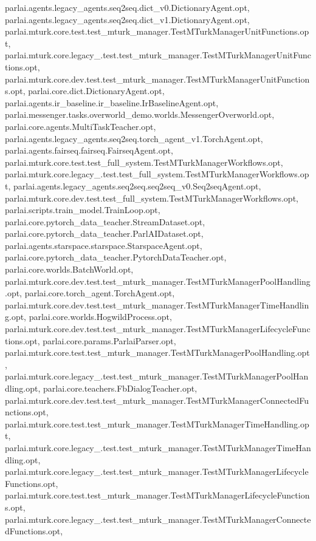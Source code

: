 parlai.\+agents.\+legacy\+\_\+agents.\+seq2seq.\+dict\+\_\+v0.\+Dictionary\+Agent.\+opt, parlai.\+agents.\+legacy\+\_\+agents.\+seq2seq.\+dict\+\_\+v1.\+Dictionary\+Agent.\+opt, parlai.\+mturk.\+core.\+test.\+test\+\_\+mturk\+\_\+manager.\+Test\+M\+Turk\+Manager\+Unit\+Functions.\+opt, parlai.\+mturk.\+core.\+legacy\+\_.\+test.\+test\+\_\+mturk\+\_\+manager.\+Test\+M\+Turk\+Manager\+Unit\+Functions.\+opt, parlai.\+mturk.\+core.\+dev.\+test.\+test\+\_\+mturk\+\_\+manager.\+Test\+M\+Turk\+Manager\+Unit\+Functions.\+opt, parlai.\+core.\+dict.\+Dictionary\+Agent.\+opt, parlai.\+agents.\+ir\+\_\+baseline.\+ir\+\_\+baseline.\+Ir\+Baseline\+Agent.\+opt, parlai.\+messenger.\+tasks.\+overworld\+\_\+demo.\+worlds.\+Messenger\+Overworld.\+opt, parlai.\+core.\+agents.\+Multi\+Task\+Teacher.\+opt, parlai.\+agents.\+legacy\+\_\+agents.\+seq2seq.\+torch\+\_\+agent\+\_\+v1.\+Torch\+Agent.\+opt, parlai.\+agents.\+fairseq.\+fairseq.\+Fairseq\+Agent.\+opt, parlai.\+mturk.\+core.\+test.\+test\+\_\+full\+\_\+system.\+Test\+M\+Turk\+Manager\+Workflows.\+opt, parlai.\+mturk.\+core.\+legacy\+\_.\+test.\+test\+\_\+full\+\_\+system.\+Test\+M\+Turk\+Manager\+Workflows.\+opt, parlai.\+agents.\+legacy\+\_\+agents.\+seq2seq.\+seq2seq\+\_\+v0.\+Seq2seq\+Agent.\+opt, parlai.\+mturk.\+core.\+dev.\+test.\+test\+\_\+full\+\_\+system.\+Test\+M\+Turk\+Manager\+Workflows.\+opt, parlai.\+scripts.\+train\+\_\+model.\+Train\+Loop.\+opt, parlai.\+core.\+pytorch\+\_\+data\+\_\+teacher.\+Stream\+Dataset.\+opt, parlai.\+core.\+pytorch\+\_\+data\+\_\+teacher.\+Parl\+A\+I\+Dataset.\+opt, parlai.\+agents.\+starspace.\+starspace.\+Starspace\+Agent.\+opt, parlai.\+core.\+pytorch\+\_\+data\+\_\+teacher.\+Pytorch\+Data\+Teacher.\+opt, parlai.\+core.\+worlds.\+Batch\+World.\+opt, parlai.\+mturk.\+core.\+dev.\+test.\+test\+\_\+mturk\+\_\+manager.\+Test\+M\+Turk\+Manager\+Pool\+Handling.\+opt, parlai.\+core.\+torch\+\_\+agent.\+Torch\+Agent.\+opt, parlai.\+mturk.\+core.\+dev.\+test.\+test\+\_\+mturk\+\_\+manager.\+Test\+M\+Turk\+Manager\+Time\+Handling.\+opt, parlai.\+core.\+worlds.\+Hogwild\+Process.\+opt, parlai.\+mturk.\+core.\+dev.\+test.\+test\+\_\+mturk\+\_\+manager.\+Test\+M\+Turk\+Manager\+Lifecycle\+Functions.\+opt, parlai.\+core.\+params.\+Parlai\+Parser.\+opt, parlai.\+mturk.\+core.\+test.\+test\+\_\+mturk\+\_\+manager.\+Test\+M\+Turk\+Manager\+Pool\+Handling.\+opt, parlai.\+mturk.\+core.\+legacy\+\_.\+test.\+test\+\_\+mturk\+\_\+manager.\+Test\+M\+Turk\+Manager\+Pool\+Handling.\+opt, parlai.\+core.\+teachers.\+Fb\+Dialog\+Teacher.\+opt, parlai.\+mturk.\+core.\+dev.\+test.\+test\+\_\+mturk\+\_\+manager.\+Test\+M\+Turk\+Manager\+Connected\+Functions.\+opt, parlai.\+mturk.\+core.\+test.\+test\+\_\+mturk\+\_\+manager.\+Test\+M\+Turk\+Manager\+Time\+Handling.\+opt, parlai.\+mturk.\+core.\+legacy\+\_.\+test.\+test\+\_\+mturk\+\_\+manager.\+Test\+M\+Turk\+Manager\+Time\+Handling.\+opt, parlai.\+mturk.\+core.\+legacy\+\_.\+test.\+test\+\_\+mturk\+\_\+manager.\+Test\+M\+Turk\+Manager\+Lifecycle\+Functions.\+opt, parlai.\+mturk.\+core.\+test.\+test\+\_\+mturk\+\_\+manager.\+Test\+M\+Turk\+Manager\+Lifecycle\+Functions.\+opt, parlai.\+mturk.\+core.\+legacy\+\_.\+test.\+test\+\_\+mturk\+\_\+manager.\+Test\+M\+Turk\+Manager\+Connected\+Functions.\+opt, 